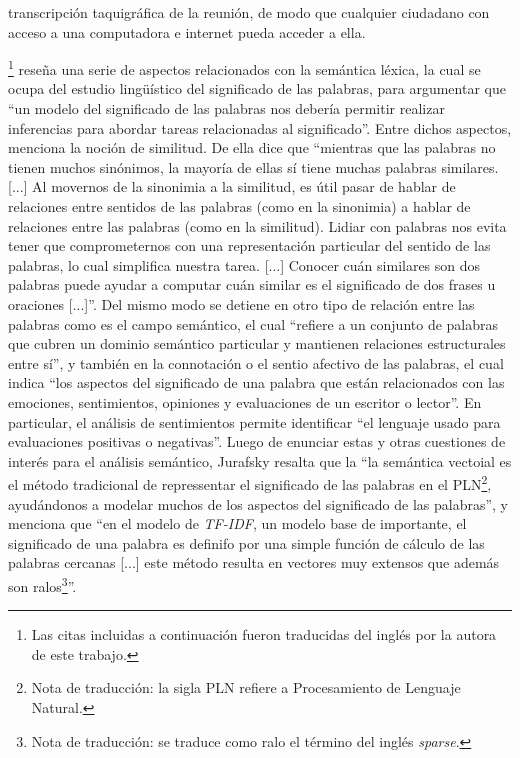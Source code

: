 transcripci\'on taquigr\'afica de la reuni\'on, de modo que cualquier ciudadano con
acceso a una computadora e internet pueda acceder a ella.
\par
\cite{jurafsky2000speech}\footnote{
Las citas incluidas a continuaci\'on fueron traducidas del ingl\'es por
la autora de este trabajo.}
reseña una serie de aspectos relacionados con la semántica léxica, la cual se ocupa
del estudio lingü\'istico del significado de las palabras, para argumentar que
``un modelo del significado de las palabras nos debería permitir realizar inferencias
para abordar tareas relacionadas al significado''. Entre dichos aspectos, menciona
la noción de similitud. De ella dice que ``mientras que las palabras no tienen muchos
sin\'onimos, la mayoría de ellas s\'i tiene muchas palabras similares. [...]
Al movernos de la sinonimia a la similitud, es \'util pasar de hablar de relaciones
entre sentidos de las palabras (como en la sinonimia) a hablar de relaciones entre las
palabras (como en la similitud). Lidiar con palabras nos evita tener que comprometernos
con una representaci\'on particular del sentido de las palabras, lo cual simplifica
nuestra tarea. [...] Conocer cuán similares son dos palabras puede ayudar a computar
cuán similar es el significado de dos frases u oraciones [...]''. Del mismo modo
se detiene en otro tipo de relaci\'on entre las palabras como es el campo
sem\'antico, el cual ``refiere a un conjunto de palabras que cubren un dominio
sem\'antico particular y mantienen relaciones estructurales entre s\'i'', y también en
la connotación o el sentio afectivo de las palabras, el cual indica ``los
aspectos del significado de una palabra que est\'an relacionados con las emociones,
sentimientos, opiniones y evaluaciones de un escritor o lector''. En particular,
el an\'alisis de sentimientos permite identificar ``el lenguaje usado para evaluaciones
positivas o negativas''. Luego de enunciar estas y otras cuestiones de interés para
el an\'alisis sem\'antico, Jurafsky resalta que la ``la semántica vectoial es el método
tradicional de repressentar el significado de las palabras en el PLN\footnote{Nota de
traducci\'on: la sigla PLN refiere a Procesamiento de Lenguaje Natural.}, ayud\'andonos
a modelar muchos de los aspectos del significado de las palabras'', y menciona que
``en el modelo de \textit{TF-IDF}, un modelo base de importante, el significado
de una palabra es definifo por una simple funci\'on de c\'alculo de las palabras
cercanas [...] este m\'etodo resulta en vectores muy extensos que adem\'as
son ralos\footnote{Nota de traducci\'on: se traduce como ralo el t\'ermino del ingl\'es
\textit{sparse}.}''.
